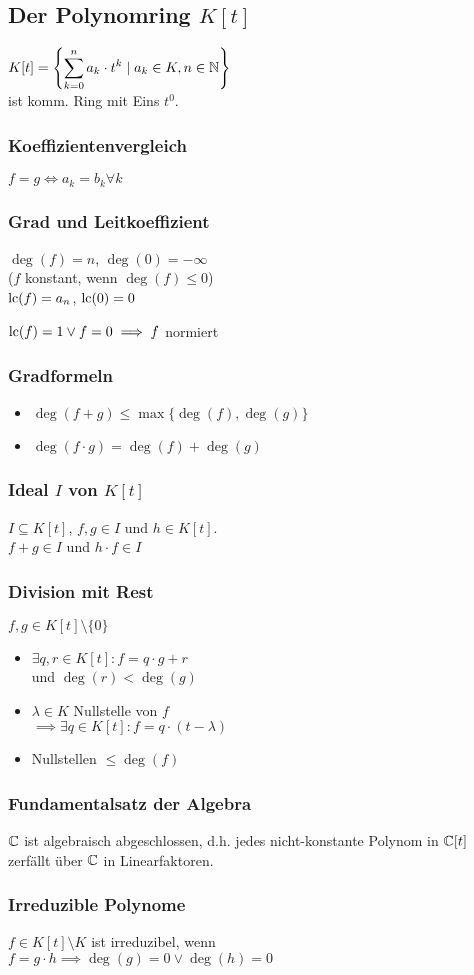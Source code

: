 \subsection*{Der Polynomring $K[t]$}
$\displaystyle K[t] = \left\{\sum_{k=0}^n a_k\cdot t^k \mid a_k \in K, n\in\mathbb{N} \right\}$ \\
ist komm. Ring mit Eins $t^0$.

\subsubsection*{Koeffizientenvergleich}
$f=g \iff a_k = b_k \forall k$

\subsubsection*{Grad und Leitkoeffizient}
$\deg(f)=n$, $\deg(0)=-\infty$ \\
($f$ konstant, wenn $\deg(f)\le0$) \\
$\operatorname{lc}(f)=a_n$, $\operatorname{lc}(0)=0$

$\operatorname{lc}(f)=1 \lor f=0 \implies f$ normiert

\subsubsection*{Gradformeln}
\begin{itemize}
	\item $\deg(f+g) \le \max\{\deg(f),\deg(g)\}$
	\item $\deg(f\cdot g) = \deg(f)+\deg(g)$
\end{itemize}

\subsubsection*{Ideal $I$ von $K[t]$}
$I\subseteq K[t]$, $f,g\in I$ und $h\in K[t]$. \\
$f+g \in I$ und $h \cdot f \in I$

\subsubsection*{Division mit Rest}
$f,g \in K[t]\setminus\{0\}$
\begin{itemize}
	\item $\exists q,r \in K[t]: f=q\cdot g + r$ \\
		und $\deg(r) < \deg(g)$
	\item $\lambda\in K$ Nullstelle von $f$\\
		$\implies\exists q\in K[t]: f=q\cdot(t-\lambda)$
	\item Nullstellen $\le \deg(f)$
\end{itemize}

\subsubsection*{Fundamentalsatz der Algebra}
$\mathbb{C}$ ist algebraisch abgeschlossen, d.h.
jedes nicht-konstante Polynom in $\mathbb{C}[t]$ zerfällt über $\mathbb{C}$ in Linearfaktoren.

\subsubsection*{Irreduzible Polynome}
$f\in K[t]\setminus K$ ist irreduzibel, wenn \\
$f=g\cdot h \implies \deg(g)=0 \lor \deg(h)=0$
